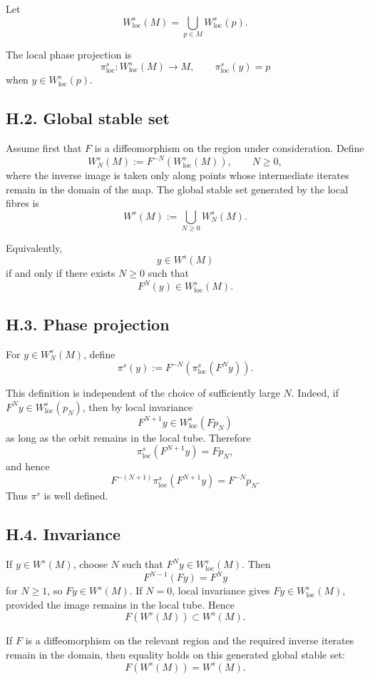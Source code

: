 \documentclass[12pt,a4paper]{article}
\theoremstyle{plain}
\numberwithin{equation}{section}
\numberwithin{theorem}{section}
\begin{document}
Let
\[
W^s_{\mathrm{loc}}(M)=
\bigcup_{p\in M}W^s_{\mathrm{loc}}(p).
\]

The local phase projection is
\[
\pi^s_{\mathrm{loc}}:W^s_{\mathrm{loc}}(M)\to M,
\qquad
\pi^s_{\mathrm{loc}}(y)=p
\]
when $y\in W^s_{\mathrm{loc}}(p)$.

\subsection{H.2. Global stable set}

Assume first that $F$ is a diffeomorphism on the region under consideration. Define
\[
W_N^s(M):=F^{-N}(W^s_{\mathrm{loc}}(M)),
\qquad N\ge0,
\]
where the inverse image is taken only along points whose intermediate iterates remain in the domain of the map. The global stable set generated by the local fibres is
\[
W^s(M):=
\bigcup_{N\ge0} W_N^s(M).
\]

Equivalently,
\[
y\in W^s(M)
\]
if and only if there exists $N\ge0$ such that
\[
F^N(y)
\in
W^s_{\mathrm{loc}}(M).
\]

\subsection{H.3. Phase projection}

For $y\in W_N^s(M)$, define
\[
\pi^s(y):=F^{-N}\left(
\pi^s_{\mathrm{loc}}(F^N y)
\right).
\]

This definition is independent of the choice of sufficiently large $N$. Indeed, if $F^N y\in W^s_{\mathrm{loc}}(p_N)$, then by local invariance
\[
F^{N+1}y
\in
W^s_{\mathrm{loc}}(Fp_N)
\]
as long as the orbit remains in the local tube. Therefore
\[
\pi^s_{\mathrm{loc}}(F^{N+1}y)=F p_N,
\]
and hence
\[
F^{-(N+1)}
\pi^s_{\mathrm{loc}}(F^{N+1}y)
=
F^{-N}p_N.
\]
Thus $\pi^s$ is well defined.

\subsection{H.4. Invariance}

If $y\in W^s(M)$, choose $N$ such that $F^N y\in W^s_{\mathrm{loc}}(M)$. Then
\[
F^{N-1}(Fy)=F^N y
\]
for $N\ge1$, so $Fy\in W^s(M)$. If $N=0$, local invariance gives $Fy\in W^s_{\mathrm{loc}}(M)$, provided the image remains in the local tube. Hence
\[
F(W^s(M))
\subset
W^s(M).
\]

If $F$ is a diffeomorphism on the relevant region and the required inverse iterates remain in the domain, then equality holds on this generated global stable set:
\[
F(W^s(M))=W^s(M).
\]
\end{document}
